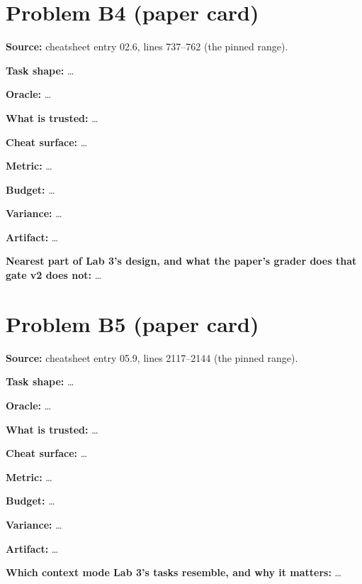 \documentclass[11pt]{article}
\begin{document}
\section*{Problem B4 (paper card)}\label{ans:B4}
\begin{answer}
\textbf{Source:} cheatsheet entry 02.6, lines 737--762 (the pinned range).

\textbf{Task shape:} \dots

\textbf{Oracle:} \dots

\textbf{What is trusted:} \dots

\textbf{Cheat surface:} \dots

\textbf{Metric:} \dots

\textbf{Budget:} \dots

\textbf{Variance:} \dots

\textbf{Artifact:} \dots

\textbf{Nearest part of Lab 3's design, and what the paper's grader does that
gate v2 does not:} \dots
\end{answer}

\section*{Problem B5 (paper card)}\label{ans:B5}
\begin{answer}
\textbf{Source:} cheatsheet entry 05.9, lines 2117--2144 (the pinned range).

\textbf{Task shape:} \dots

\textbf{Oracle:} \dots

\textbf{What is trusted:} \dots

\textbf{Cheat surface:} \dots

\textbf{Metric:} \dots

\textbf{Budget:} \dots

\textbf{Variance:} \dots

\textbf{Artifact:} \dots

\textbf{Which context mode Lab 3's tasks resemble, and why it matters:} \dots
\end{answer}

\end{document}
